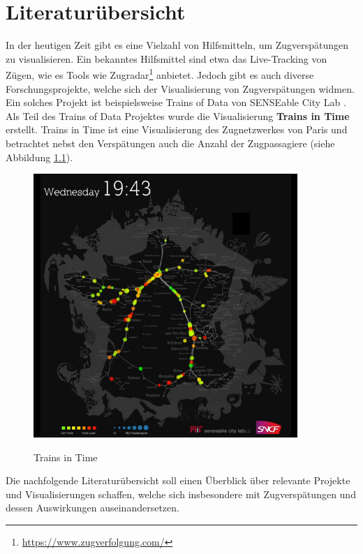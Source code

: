 \chapter{Literaturübersicht}
\label{kap:literaturübersicht}
In der heutigen Zeit gibt es eine Vielzahl von Hilfsmitteln, um Zugverspätungen zu visualisieren. Ein bekanntes Hilfsmittel sind etwa das Live-Tracking von Zügen, wie es Tools wie Zugradar\footnote{\url{https://www.zugverfolgung.com/}} anbietet. Jedoch gibt es auch diverse Forschungsprojekte, welche sich der Visualisierung von Zugverspätungen widmen. Ein solches Projekt ist beispielsweise Trains of Data von SENSEable City Lab \parencite{trains_of_data_2012}. Als Teil des Trains of Data Projektes wurde die Visualisierung \textbf{Trains in Time} erstellt. Trains in Time ist eine Visualisierung des Zugnetzwerkes von Paris und betrachtet nebst den Verspätungen auch die Anzahl der Zugpassagiere (siehe Abbildung \ref{fig_trains_in_time}).

\begin{figure}[H]
    \caption{Trains in Time \parencite{trains_of_data_2012}}
    \includegraphics[height=10cm]{content/00_assets/trains_in_time.jpg}
    \label{fig_trains_in_time}
\end{figure}

Die nachfolgende Literaturübersicht soll einen Überblick über relevante Projekte und Visualisierungen schaffen, welche sich insbesondere mit Zugverspätungen und dessen Auswirkungen auseinandersetzen.
